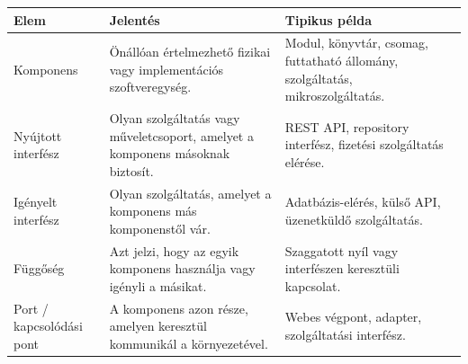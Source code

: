 \begin{tabularx}{\textwidth}{L{34mm}X X}
\toprule
\textbf{Elem} & \textbf{Jelentés} & \textbf{Tipikus példa} \\
\midrule
Komponens & Önállóan értelmezhető fizikai vagy implementációs szoftveregység. & Modul, könyvtár, csomag, futtatható állomány, szolgáltatás, mikroszolgáltatás. \\
Nyújtott interfész & Olyan szolgáltatás vagy műveletcsoport, amelyet a komponens másoknak biztosít. & REST API, repository interfész, fizetési szolgáltatás elérése. \\
Igényelt interfész & Olyan szolgáltatás, amelyet a komponens más komponenstől vár. & Adatbázis-elérés, külső API, üzenetküldő szolgáltatás. \\
Függőség & Azt jelzi, hogy az egyik komponens használja vagy igényli a másikat. & Szaggatott nyíl vagy interfészen keresztüli kapcsolat. \\
Port / kapcsolódási pont & A komponens azon része, amelyen keresztül kommunikál a környezetével. & Webes végpont, adapter, szolgáltatási interfész. \\
\bottomrule
\end{tabularx}
